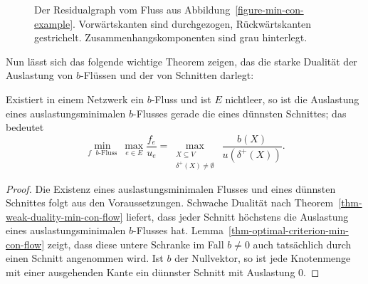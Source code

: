 \begin{figure}
\begin{adjustbox}{center}
{{\begin{tikzpicture}[lul/.style={draw,
			ellipse,
			fill=white,
			align=center,
			inner sep=0pt,
			outer sep=4pt,
			text width=7mm,
			minimum height=1.5cm
		},
		scale=0.9]
		\end{tikzpicture}
	}}
	\end{adjustbox}
	\caption{Der Residualgraph vom Fluss aus Abbildung~\ref{figure-min-con-example}. Vorwärtskanten sind durchgezogen, Rückwärtskanten gestrichelt. Zusammenhangskomponenten sind grau hinterlegt.}
	\label{figure-min-con-example-residual-graph}
\end{figure}

Nun lässt sich das folgende wichtige Theorem zeigen, das die starke Dualität der Auslastung von $b$-Flüssen und der von Schnitten darlegt:

\begin{theorem}\label{thm-strong-duality-sparsest-cut-min-flow}
	Existiert in einem Netzwerk ein $b$-Fluss und ist $E$ nichtleer, so ist die Auslastung eines auslastungsminimalen $b$-Flusses gerade die eines dünnsten Schnittes; das bedeutet
	\[
	\min_{\text{$f$ $b$-Fluss}}~\max_{e\in E}\frac{f_e}{u_e} = \max_{\substack{X\subseteq V\\ \delta^+(X)\neq\emptyset}} ~ \frac{b(X)}{u(\delta^+(X))}.
	\]
\end{theorem}
\begin{proof}
	Die Existenz eines auslastungsminimalen Flusses und eines dünnsten Schnittes folgt aus den Voraussetzungen.
	Schwache Dualität nach Theorem~\ref{thm-weak-duality-min-con-flow} liefert, dass jeder Schnitt höchstens die Auslastung eines auslastungsminimalen $b$-Flusses hat.
	Lemma~\ref{thm-optimal-criterion-min-con-flow} zeigt, dass diese untere Schranke im Fall $b\neq 0$ auch tatsächlich durch einen Schnitt angenommen wird.
	Ist $b$ der Nullvektor, so ist jede Knotenmenge mit einer ausgehenden Kante ein dünnster Schnitt mit Auslastung $0$.
\end{proof}

